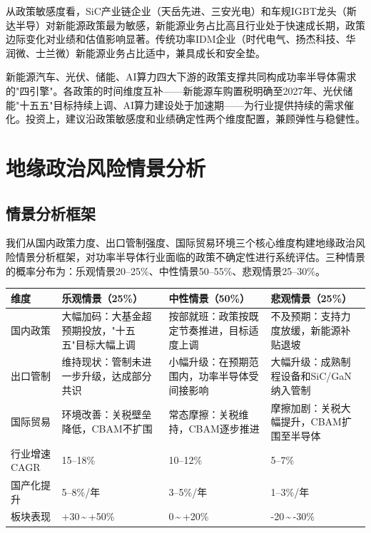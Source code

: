 从政策敏感度看，SiC产业链企业（天岳先进、三安光电）和车规IGBT龙头（斯达半导）对新能源政策最为敏感，新能源业务占比高且行业处于快速成长期，政策边际变化对业绩和估值影响显著。传统功率IDM企业（时代电气、扬杰科技、华润微、士兰微）新能源业务占比适中，兼具成长和安全垫。

\begin{keyinsight}[新能源政策联动效应]
新能源汽车、光伏、储能、AI算力四大下游的政策支撑共同构成功率半导体需求的"四引擎"。各政策的时间维度互补——新能源车购置税明确至2027年、光伏储能"十五五"目标持续上调、AI算力建设处于加速期——为行业提供持续的需求催化。投资上，建议沿政策敏感度和业绩确定性两个维度配置，兼顾弹性与稳健性。
\end{keyinsight}

\section{地缘政治风险情景分析}

\subsection{情景分析框架}

我们从国内政策力度、出口管制强度、国际贸易环境三个核心维度构建地缘政治风险情景分析框架，对功率半导体行业面临的政策不确定性进行系统评估。三种情景的概率分布为：乐观情景20--25\%、中性情景50--55\%、悲观情景25--30\%。

\begin{exhibitbox}[表 8-11：三种情景核心假设对比]
\centering
\small
\begin{tabularx}{\textwidth}{X L{4.2cm} L{4.2cm} L{4.2cm}}
\toprule
\textbf{维度} & \textbf{乐观情景（25\%）} & \textbf{中性情景（50\%）} & \textbf{悲观情景（25\%）} \\
\midrule
国内政策 & 大幅加码：大基金超预期投放，"十五五"目标大幅上调 & 按部就班：政策按既定节奏推进，目标适度上调 & 不及预期：支持力度放缓，新能源补贴退坡 \\
出口管制 & 维持现状：管制未进一步升级，达成部分共识 & 小幅升级：在预期范围内，功率半导体受间接影响 & 大幅升级：成熟制程设备和SiC/GaN纳入管制 \\
国际贸易 & 环境改善：关税壁垒降低，CBAM不扩围 & 常态摩擦：关税维持，CBAM逐步推进 & 摩擦加剧：关税大幅提升，CBAM扩围至半导体 \\
\midrule
行业增速CAGR & 15--18\% & 10--12\% & 5--7\% \\
国产化提升 & 5--8\%/年 & 3--5\%/年 & 1--3\%/年 \\
板块表现 & +30\,\~{}\,+50\% & 0\,\~{}\,+20\% & -20\,\~{}\,-30\% \\
\bottomrule
\end{tabularx}
\end{exhibitbox}

